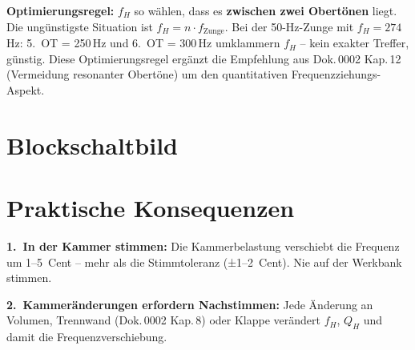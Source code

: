 \documentclass[11pt,a4paper]{article}
\begin{document}
\begin{keybox}
\textbf{Optimierungsregel:} $f_H$ so wählen, dass es \textbf{zwischen zwei Obertönen} liegt. Die ungünstigste Situation ist $f_H = n \cdot f_\text{Zunge}$. Bei der 50-Hz-Zunge mit $f_H = 274$\,Hz: 5.~OT = 250\,Hz und 6.~OT = 300\,Hz umklammern $f_H$ -- kein exakter Treffer, günstig. Diese Optimierungsregel ergänzt die Empfehlung aus Dok.\,0002 Kap.\,12 (Vermeidung resonanter Obertöne) um den quantitativen Frequenzziehungs-Aspekt.
\end{keybox}

\section{Blockschaltbild}

\begin{center}
\end{center}

\section{Praktische Konsequenzen}

\textbf{1.\ In der Kammer stimmen:} Die Kammerbelastung verschiebt die Frequenz um 1--5~Cent -- mehr als die Stimmtoleranz (±1--2~Cent). Nie auf der Werkbank stimmen.

\textbf{2.\ Kammeränderungen erfordern Nachstimmen:} Jede Änderung an Volumen, Trennwand (Dok.\,0002 Kap.\,8) oder Klappe verändert $f_H$, $Q_H$ und damit die Frequenzverschiebung.
\end{document}
